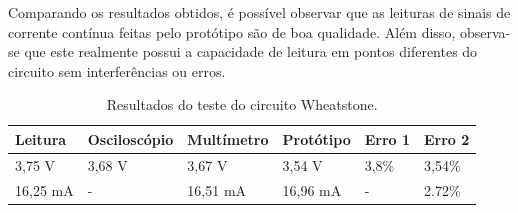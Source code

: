 Comparando os resultados obtidos, é possível observar que as leituras de sinais de corrente contínua feitas pelo protótipo são de boa qualidade. Além disso, observa-se que este realmente possui a capacidade de leitura em pontos diferentes do circuito sem interferências ou erros.

\begin{table}[!ht]
    \centering
    \caption{Resultados do teste do circuito Wheatstone.}
    \label{tab:resultados-wheatstone}
    \begin{tabular}{|l|l|l|l|l|l|}
        \hline
        \textbf{Leitura} & \textbf{Osciloscópio} & \textbf{Multímetro} & \textbf{Protótipo}    & \textbf{Erro 1}  & \textbf{Erro 2}   \\ \hline
        3,75 V           & 3,68 V                & 3,67 V              & 3,54 V                & 3,8\%            & 3,54\%            \\ \hline
        16,25 mA         & -                     & 16,51 mA            & 16,96 mA              & -                & 2.72\%            \\ \hline
    \end{tabular}
\end{table}
